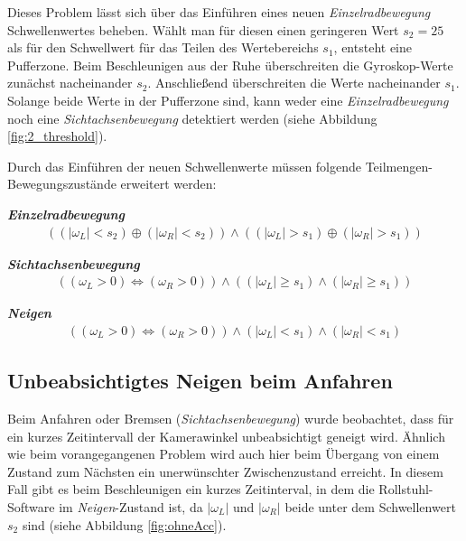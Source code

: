 

Dieses Problem lässt sich über das Einführen eines neuen \textit{Einzelradbewegung} Schwellenwertes beheben.
Wählt man für diesen einen geringeren Wert $s_2 = 25$ als für den Schwellwert für das Teilen des Wertebereichs $s_1$, entsteht eine Pufferzone.
Beim Beschleunigen aus der Ruhe überschreiten die Gyroskop-Werte zunächst nacheinander $s_2$.
Anschließend überschreiten die Werte nacheinander $s_1$.
Solange beide Werte in der Pufferzone sind, kann weder eine \textit{Einzelradbewegung} noch eine \textit{Sichtachsenbewegung} detektiert werden (siehe Abbildung \ref{fig:2_threshold}).



Durch das Einführen der neuen Schwellenwerte müssen folgende Teilmengen-Bewegungszustände erweitert werden:

\textbf{\textit{Einzelradbewegung}}
\begin{align}
    ((|\omega_L| < s_2) \oplus (|\omega_R| < s_2)) \land ((|\omega_L| > s_1) \oplus (|\omega_R| > s_1))
\end{align}

\textbf{\textit{Sichtachsenbewegung}}
\begin{align}
    ((\omega_L > 0) \Leftrightarrow (\omega_R > 0)) \land ((|\omega_L| \geq s_1) \land (|\omega_R| \geq s_1))
\end{align}

\textbf{\textit{Neigen}}
\begin{align}
    ((\omega_L > 0) \Leftrightarrow (\omega_R > 0)) \land (|\omega_L| < s_1) \land (|\omega_R| < s_1)
\end{align}

\subsection{Unbeabsichtigtes Neigen beim Anfahren}
Beim Anfahren oder Bremsen (\textit{Sichtachsenbewegung}) wurde beobachtet, dass für ein kurzes Zeitintervall der Kamerawinkel unbeabsichtigt geneigt wird.
Ähnlich wie beim vorangegangenen Problem wird auch hier beim Übergang von einem Zustand zum Nächsten ein unerwünschter Zwischenzustand erreicht.
In diesem Fall gibt es beim Beschleunigen ein kurzes Zeitinterval, in dem die Rollstuhl-Software im \textit{Neigen}-Zustand ist, da $|\omega_L|$ und $|\omega_R|$ beide unter dem Schwellenwert $s_2$ sind (siehe Abbildung \ref{fig:ohneAcc}).



